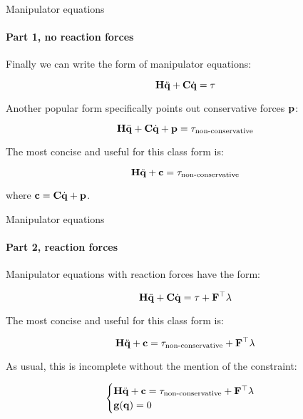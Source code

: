 \documentclass{beamer}
\begin{document}
\begin{frame}{Manipulator equations}
\framesubtitle{Part 1, no reaction forces}
\begin{flushleft}

Finally we can write the form of manipulator equations:

\begin{equation}
    \mathbf{H} \ddot{\mathbf{q}} + \mathbf{C} \dot{\mathbf{q}} = \tau
\end{equation}

Another popular form specifically points out conservative forces $\mathbf{p}$:

\begin{equation}
    \mathbf{H} \ddot{\mathbf{q}} + \mathbf{C} \dot{\mathbf{q}} + \mathbf{p} = \tau_{\text{non-conservative}}
\end{equation}

The most concise and useful for this class form is:

\begin{equation}
    \mathbf{H} \ddot{\mathbf{q}} + \mathbf{c} = \tau_{\text{non-conservative}}
\end{equation}

where $\mathbf{c} = \mathbf{C} \dot{\mathbf{q}} + \mathbf{p}$.

\end{flushleft}
\end{frame}



\begin{frame}{Manipulator equations}
\framesubtitle{Part 2, reaction forces}
\begin{flushleft}

Manipulator equations with reaction forces have the form:

\begin{equation}
    \mathbf{H} \ddot{\mathbf{q}} + \mathbf{C} \dot{\mathbf{q}} = \tau + \mathbf{F}^\top \lambda
\end{equation}

The most concise and useful for this class form is:

\begin{equation}
    \mathbf{H} \ddot{\mathbf{q}} + \mathbf{c} = \tau_{\text{non-conservative}} + \mathbf{F}^\top \lambda
\end{equation}

As usual, this is incomplete without the mention of the constraint:

\begin{equation}
\begin{cases}
    \mathbf{H} \ddot{\mathbf{q}} + \mathbf{c} = \tau_{\text{non-conservative}} + \mathbf{F}^\top \lambda \\
    \mathbf{g}(\mathbf{q}) = 0
\end{cases}
\end{equation}

\end{flushleft}
\end{frame}
\end{document}
